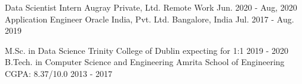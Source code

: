 \documentclass[12pt, a4paper]{awesome-cv}
\begin{document}
\vspace{-2.0ex}
\begin{cventries}
\cventry
    {Data Scientist Intern}
    {Augray Private, Ltd.}
    {Remote Work}
    {Jun. 2020 - Aug, 2020}
    {}
\cventry
    {Application Engineer}
    {Oracle India, Pvt. Ltd.}
    {Bangalore, India}
{Jul. 2017 - Aug. 2019}
    {}
\end{cventries}

\vspace{-2.0ex}
\begin{cventries}
  \cventry
    {M.Sc. in Data Science}
    {Trinity College of Dublin}
    {expecting for 1:1}
    {2019 - 2020}
    {}
  \cventry
    {B.Tech. in Computer Science and Engineering}
    {Amrita School of Engineering}
    {CGPA: 8.37/10.0}
    {2013 - 2017}
    {}
\end{cventries}
\end{document}
